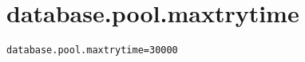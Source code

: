 \section{database.pool.maxtrytime}
\label{configuration:DatabasePoolMaxtrytime}
\AvailableInJavaOnly{\TODO}
\begin{lstlisting}[style=Props,caption={Usage example for \textit{database.pool.maxtrytime}}]
database.pool.maxtrytime=30000
\end{lstlisting}